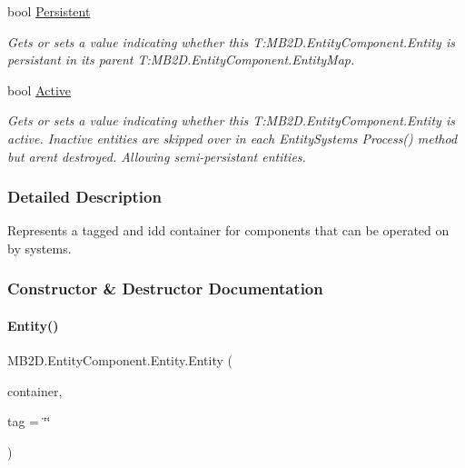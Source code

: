 \begin{DoxyCompactItemize}
bool \hyperlink{class_m_b2_d_1_1_entity_component_1_1_entity_af72e02dfa9b3b5a24e7c97eb6ce2fd3a}{Persistent}
\begin{DoxyCompactList}\small\item\em Gets or sets a value indicating whether this T\+:\+M\+B2\+D.\+Entity\+Component.\+Entity is persistant in its parent T\+:\+M\+B2\+D.\+Entity\+Component.\+Entity\+Map. \end{DoxyCompactList}\item 
bool \hyperlink{class_m_b2_d_1_1_entity_component_1_1_entity_a3860df1e77b87727abd227e9e713a97b}{Active}
\begin{DoxyCompactList}\small\item\em Gets or sets a value indicating whether this T\+:\+M\+B2\+D.\+Entity\+Component.\+Entity is active. Inactive entities are skipped over in each Entity\+Systems Process() method but aren\textquotesingle{}t destroyed. Allowing semi-\/persistant entities. \end{DoxyCompactList}\end{DoxyCompactItemize}


\subsubsection{Detailed Description}
Represents a tagged and id\textquotesingle{}d container for components that can be operated on by systems. 



\subsubsection{Constructor \& Destructor Documentation}
\hypertarget{class_m_b2_d_1_1_entity_component_1_1_entity_a6decb855bea1bcf18cd6c2869ebc16a6}{}\label{class_m_b2_d_1_1_entity_component_1_1_entity_a6decb855bea1bcf18cd6c2869ebc16a6} 
\paragraph{\texorpdfstring{Entity()}{Entity()}}
{\footnotesize\ttfamily M\+B2\+D.\+Entity\+Component.\+Entity.\+Entity (\begin{DoxyParamCaption}\item[{\hyperlink{class_m_b2_d_1_1_entity_component_1_1_entity_map}{Entity\+Map}}]{container,  }\item[{string}]{tag = {\ttfamily \char`\"{}\char`\"{}} }\end{DoxyParamCaption})\hspace{0.3cm}{\ttfamily [inline]}}



